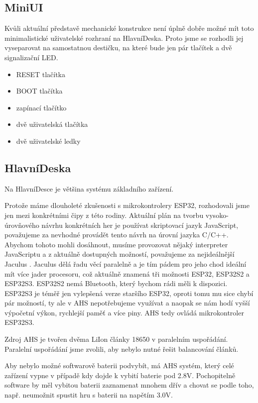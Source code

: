 \subsection{MiniUI}
Kvůli aktuální představě mechanické konstrukce není úplně dobře možné mít toto minimalistické uživatelské rozhraní na HlavníDeska.
Proto jsme se rozhodli jej vyseparovat na samostatnou destičku, na které bude jen pár tlačítek a dvě signalizační LED.

\begin{itemize}
    \item RESET tlačítka
    \item BOOT tlačítka
    \item zapínací tlačítko
    \item dvě uživatelská tlačítka 
    \item dvě uživatelské ledky
\end{itemize}

\subsection{HlavníDeska}
Na HlavníDesce je většina systému základního zařízení.

Protože máme dlouholeté zkušenosti s mikrokontrolery ESP32, rozhodovali jsme jen mezi konkrétními čipy z této rodiny.
Aktuální plán na tvorbu vysoko-úrovňového návrhu konkrétních her je používat skriptovací jazyk JavaScript, považujeme za nevhodné provádět tento návrh na úrovní jazyka C/C++.
Abychom tohoto mohli dosáhnout, musíme provozovat nějaký interpreter JavaScriptu a z aktuálně dostupných možností, považujeme za nejideálnější Jaculus \cite{Jaculus}.
Jaculus dělá řadu věcí paralelně a je tím pádem pro jeho chod ideální mít více jader procesoru, což aktuálně znamená tři možnosti ESP32, ESP32S2 a ESP32S3.
ESP32S2 nemá Bluetooth, který bychom rádi měli k dispozici.
ESP32S3 je téměř jen vylepšená verze staršího ESP32, oproti tomu mu sice chybí pár možností, ty ale v AHS nepotřebujeme využívat a naopak se nám hodí vyšší výpočetní výkon, rychlejší paměť a více piny.
AHS tedy ovládá mikrokontroler ESP32S3.

Zdroj AHS je tvořen dvěma LiIon články 18650 v paralelním uspořádání.
Paralelní uspořádání jsme zvolili, aby nebylo nutné řešit balancování článků.

Aby nebylo možné softwarově baterii podvybít, má AHS systém, který celé zařízení vypne v případě kdy dojde k vybití baterie pod 2.8V.
Pochopitelně software by měl vybitou baterii zaznamenat mnohem dřív a chovat se podle toho, např. neumožnit spustit hru s baterii na napětím 3.0V.

